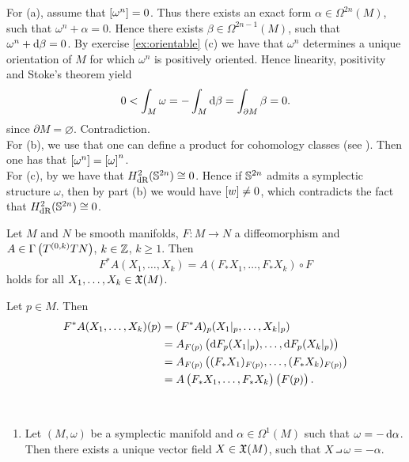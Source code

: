\begin{solution}
For (a), assume that $\sbr[0]{\omega^n} = 0$. Thus there exists an exact form $\alpha \in \Omega^{2n}(M)$, such that $\omega^n + \alpha = 0$. Hence there exists $\beta \in \Omega^{2n - 1}(M)$, such that $\omega^n + \mathop{}\!\mathrm{d} \beta = 0$. By exercise \ref{ex:orientable} (c) we have that $\omega^n$ determines a unique orientation of $M$ for which $\omega^n$ is positively oriented. Hence linearity, positivity and Stoke's theorem \cite[407,411]{lee:smooth_manifolds:2013} yield
\begin{equation*}
0 < \int_M \omega = - \int_M \mathop{}\!\mathrm{d} \beta = \int_{\partial M} \beta = 0.
\end{equation*} 
\noindent since $\partial M = \varnothing$. Contradiction.\\
For (b), we use that one can define a product for cohomology classes (see \cite[464]{lee:smooth_manifolds:2013}). Then one has that $\sbr[0]{\omega^n} = \sbr[0]{\omega}^n$.\\
For (c), by \cite[450]{lee:smooth_manifolds:2013} we have that $H_{\mathrm{dR}}^2(\mathbb{S}^{2n}) \cong 0$. Hence if $\mathbb{S}^{2n}$ admits a symplectic structure $\omega$, then by part (b) we would have $\sbr[0]{w} \neq 0$, which contradicts the fact that $H_{\mathrm{dR}}^2(\mathbb{S}^{2n}) \cong 0$.
\end{solution}

\begin{exercise}
Let $M$ and $N$ be smooth manifolds, $F : M \to N$ a diffeomorphism and $A \in \Gamma\del[1]{T^{(0,k)}TN}$, $k \in \mathbb{Z}$, $k \geq 1$. Then 
\begin{equation}
F^*A(X_1,\dots,X_k) = A(F_*X_1,\dots,F_*X_k) \circ F
\end{equation}
\noindent holds for all $X_1,\dots,X_k \in \mathfrak{X}(M)$.
\end{exercise}

\begin{solution}
Let $p \in M$. Then
\begin{align*}
F^*A(X_1,\dots,X_k)(p) &= (F^*A)_p(X_1\vert_p,\dots,X_k\vert_p)\\
&= A_{F(p)}\del[1]{\d F_p(X_1\vert_p),\dots,\d F_p(X_k\vert_p)}\\
&= A_{F(p)}\del[1]{(F_*X_1)_{F(p)},\dots,(F_*X_k)_{F(p)}}\\
&= A\del[1]{F_*X_1,\dots,F_*X_k}\del[1]{F(p)}.
\end{align*}
\end{solution}

\begin{exercise}
~
\begin{enumerate}[label = \textup{(}\alph*\textup{)}]
\item Let $(M,\omega)$ be a symplectic manifold and $\alpha \in \Omega^1(M)$ such that $\omega = -\mathop{}\!\mathrm{d} \alpha$. Then there exists a unique vector field $X \in \mathfrak{X}(M)$, such that $X \intprod \omega = -\alpha$. 
\end{enumerate}
\end{exercise}

